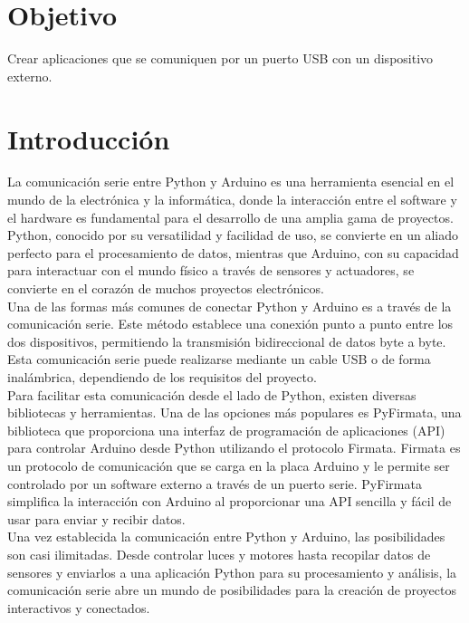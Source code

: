 \documentclass{article}
\begin{document}
\thispagestyle{empty} 

\section*{Objetivo}
{\Large Crear aplicaciones que se comuniquen por un puerto USB con un dispositivo externo.}

\vspace{1\baselineskip}

\section*{Introducción}
{\Large 

La comunicación serie entre Python y Arduino es una herramienta esencial en el mundo de la electrónica y la informática, donde la interacción entre el software y el hardware es fundamental para el desarrollo de una amplia gama de proyectos. Python, conocido por su versatilidad y facilidad de uso, se convierte en un aliado perfecto para el procesamiento de datos, mientras que Arduino, con su capacidad para interactuar con el mundo físico a través de sensores y actuadores, se convierte en el corazón de muchos proyectos electrónicos.\\

Una de las formas más comunes de conectar Python y Arduino es a través de la comunicación serie. Este método establece una conexión punto a punto entre los dos dispositivos, permitiendo la transmisión bidireccional de datos byte a byte. Esta comunicación serie puede realizarse mediante un cable USB o de forma inalámbrica, dependiendo de los requisitos del proyecto.\\

Para facilitar esta comunicación desde el lado de Python, existen diversas bibliotecas y herramientas. Una de las opciones más populares es PyFirmata, una biblioteca que proporciona una interfaz de programación de aplicaciones (API) para controlar Arduino desde Python utilizando el protocolo Firmata. Firmata es un protocolo de comunicación que se carga en la placa Arduino y le permite ser controlado por un software externo a través de un puerto serie. PyFirmata simplifica la interacción con Arduino al proporcionar una API sencilla y fácil de usar para enviar y recibir datos.\\

Una vez establecida la comunicación entre Python y Arduino, las posibilidades son casi ilimitadas. Desde controlar luces y motores hasta recopilar datos de sensores y enviarlos a una aplicación Python para su procesamiento y análisis, la comunicación serie abre un mundo de posibilidades para la creación de proyectos interactivos y conectados.

}
\end{document}
